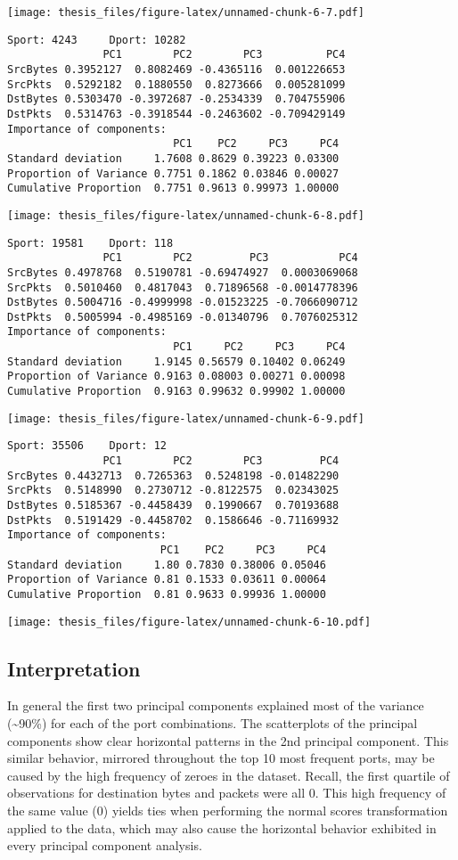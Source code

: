 \documentclass[12pt,twoside]{dukestatscithesis}
\theoremstyle{definition}
\theoremstyle{definition}
\theoremstyle{definition}
\theoremstyle{remark}
\begin{document}
\texttt{[image: thesis\_files/figure-latex/unnamed-chunk-6-7.pdf]}
\begin{verbatim}
Sport: 4243     Dport: 10282 
               PC1        PC2        PC3          PC4
SrcBytes 0.3952127  0.8082469 -0.4365116  0.001226653
SrcPkts  0.5292182  0.1880550  0.8273666  0.005281099
DstBytes 0.5303470 -0.3972687 -0.2534339  0.704755906
DstPkts  0.5314763 -0.3918544 -0.2463602 -0.709429149
Importance of components:
                          PC1    PC2     PC3     PC4
Standard deviation     1.7608 0.8629 0.39223 0.03300
Proportion of Variance 0.7751 0.1862 0.03846 0.00027
Cumulative Proportion  0.7751 0.9613 0.99973 1.00000
\end{verbatim}
\texttt{[image: thesis\_files/figure-latex/unnamed-chunk-6-8.pdf]}
\begin{verbatim}
Sport: 19581    Dport: 118 
               PC1        PC2         PC3           PC4
SrcBytes 0.4978768  0.5190781 -0.69474927  0.0003069068
SrcPkts  0.5010460  0.4817043  0.71896568 -0.0014778396
DstBytes 0.5004716 -0.4999998 -0.01523225 -0.7066090712
DstPkts  0.5005994 -0.4985169 -0.01340796  0.7076025312
Importance of components:
                          PC1     PC2     PC3     PC4
Standard deviation     1.9145 0.56579 0.10402 0.06249
Proportion of Variance 0.9163 0.08003 0.00271 0.00098
Cumulative Proportion  0.9163 0.99632 0.99902 1.00000
\end{verbatim}
\texttt{[image: thesis\_files/figure-latex/unnamed-chunk-6-9.pdf]}
\begin{verbatim}
Sport: 35506    Dport: 12 
               PC1        PC2        PC3         PC4
SrcBytes 0.4432713  0.7265363  0.5248198 -0.01482290
SrcPkts  0.5148990  0.2730712 -0.8122575  0.02343025
DstBytes 0.5185367 -0.4458439  0.1990667  0.70193688
DstPkts  0.5191429 -0.4458702  0.1586646 -0.71169932
Importance of components:
                        PC1    PC2     PC3     PC4
Standard deviation     1.80 0.7830 0.38006 0.05046
Proportion of Variance 0.81 0.1533 0.03611 0.00064
Cumulative Proportion  0.81 0.9633 0.99936 1.00000
\end{verbatim}
\texttt{[image: thesis\_files/figure-latex/unnamed-chunk-6-10.pdf]}

\subsection{Interpretation}\label{interpretation}

In general the first two principal components explained most of the
variance (\textasciitilde{}90\%) for each of the port combinations. The
scatterplots of the principal components show clear horizontal patterns
in the 2nd principal component. This similar behavior, mirrored
throughout the top 10 most frequent ports, may be caused by the high
frequency of zeroes in the dataset. Recall, the first quartile of
observations for destination bytes and packets were all 0. This high
frequency of the same value (0) yields ties when performing the normal
scores transformation applied to the data, which may also cause the
horizontal behavior exhibited in every principal component analysis.
\end{document}
